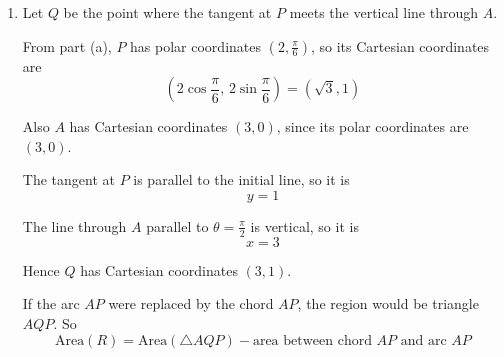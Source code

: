 \documentclass[leqno]{article}
\begin{document}
\begin{enumerate}[
  label=\textbf{\arabic*.},
  leftmargin=*,
  topsep=0pt,
  partopsep=0pt,
  parsep=0pt
]
\begin{djsSolution}
\begin{enumerate}[label=\textbf{(\alph*)}]
Here
\[
r=1+2\cos 2\theta,\qquad \frac{\mathrm{d}r}{\mathrm{d}\theta}=-4\sin 2\theta
\]

Now
\begin{align*}
\frac{\mathrm{d}y}{\mathrm{d}\theta}
&=\frac{\mathrm{d}}{\mathrm{d}\theta}(r\sin\theta) \\
&=\frac{\mathrm{d}r}{\mathrm{d}\theta}\sin\theta+r\cos\theta \\
&=-4\sin 2\theta\sin\theta+(1+2\cos 2\theta)\cos\theta \\
&=-8\sin^2\theta\cos\theta+\bigl(1+2(1-2\sin^2\theta)\bigr)\cos\theta \\
&=-8\sin^2\theta\cos\theta+(3-4\sin^2\theta)\cos\theta \\
&=3\cos\theta(1-4\sin^2\theta)
\end{align*}

So
\[
3\cos\theta(1-4\sin^2\theta)=0
\]

For \(0\le \theta \le \frac{\pi}{3}\), we have \(\cos\theta>0\), so
\[
1-4\sin^2\theta=0
\]

Hence
\[
\sin\theta=\frac12
\]

and in the given interval this gives
\[
\theta=\frac{\pi}{6}
\]

Now find \(r\):
\[
r=1+2\cos\left(2\times \frac{\pi}{6}\right)
=1+2\cos\frac{\pi}{3}
=1+2\times \frac12
=2
\]

Therefore \(P\) has polar coordinates
\[
\left(2,\frac{\pi}{6}\right)
\]

  \item Let \(Q\) be the point where the tangent at \(P\) meets the vertical line through \(A\).

From part (a), \(P\) has polar coordinates \(\left(2,\frac{\pi}{6}\right)\), so its Cartesian coordinates are
\[
\left(2\cos\frac{\pi}{6},\,2\sin\frac{\pi}{6}\right)=(\sqrt3,1)
\]

Also \(A\) has Cartesian coordinates \((3,0)\), since its polar coordinates are \((3,0)\).

The tangent at \(P\) is parallel to the initial line, so it is
\[
y=1
\]

The line through \(A\) parallel to \(\theta=\frac{\pi}{2}\) is vertical, so it is
\[
x=3
\]

Hence \(Q\) has Cartesian coordinates \((3,1)\).

If the arc \(AP\) were replaced by the chord \(AP\), the region would be triangle \(AQP\). So
\[
\text{Area}(R)=\text{Area}(\triangle AQP)-\text{area between chord }AP\text{ and arc }AP
\]


\end{enumerate}
\end{djsSolution}
\end{enumerate}
\end{document}
